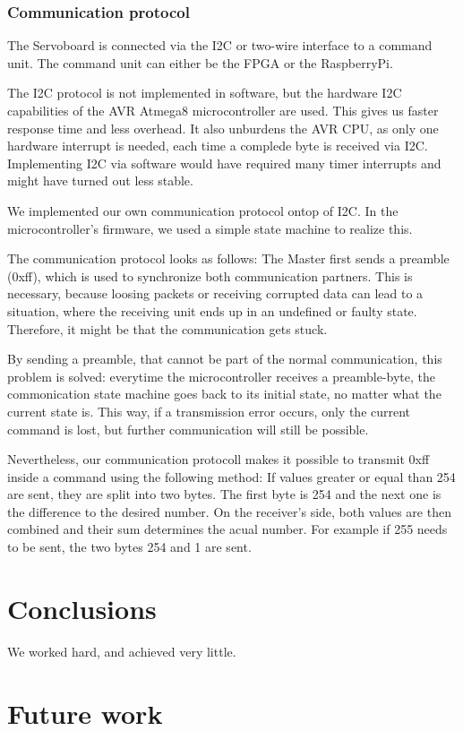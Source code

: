 \documentclass[12pt]{article}
\begin{document}
\subsubsection{Communication protocol}
The Servoboard is connected via the I2C or two-wire interface to a command unit.
The command unit can either be the FPGA or the RaspberryPi.


The I2C protocol is not implemented in software, but the hardware I2C capabilities of the AVR Atmega8 microcontroller are used.
This gives us faster response time and less overhead.
It also unburdens the AVR CPU, as only one hardware interrupt is needed, each time a complede byte is received via I2C.
Implementing I2C via software would have required many timer interrupts and might have turned out less stable.


We implemented our own communication protocol ontop of I2C.
In the microcontroller's firmware, we used a simple state machine to realize this.

The communication protocol looks as follows:
The Master first sends a preamble (0xff), which is used to synchronize both communication partners.
This is necessary, because loosing packets or receiving corrupted data can lead to a situation, where the receiving unit ends up in an undefined or faulty state.
Therefore, it might be that the communication gets stuck.

By sending a preamble, that cannot be part of the normal communication, this problem is solved: everytime the microcontroller receives a preamble-byte, the commonication state machine goes back to its initial state, no matter what the current state is.
This way, if a transmission error occurs, only the current command is lost, but further communication will still be possible.


Nevertheless, our communication protocoll makes it possible to transmit 0xff inside a command using the following method:
If values greater or equal than 254 are sent, they are split into two bytes.
The first byte is 254 and the next one is the difference to the desired number.
On the receiver's side, both values are then combined and their sum determines the acual number. 
For example if 255 needs to be sent, the two bytes 254 and 1 are sent.

\section{Conclusions}\label{conclusions}
We worked hard, and achieved very little.

\section{Future work}



\end{document}
